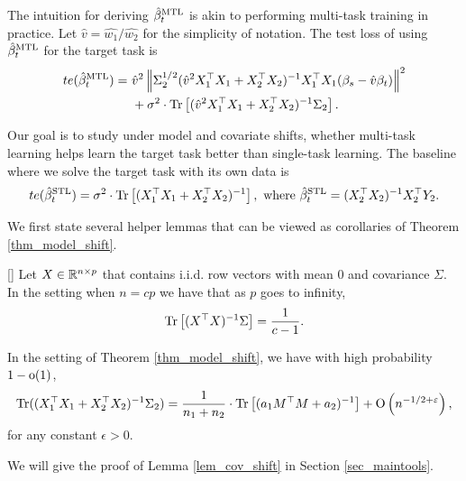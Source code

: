 The intuition for deriving $\hat{\beta}_t^{\text{MTL}}$ is akin to performing multi-task training in practice.
Let $\hat{v} = \hat{w_1} / \hat{w_2}$ for the simplicity of notation.
The test loss of using $\hat{\beta}_t^{\text{MTL}}$ for the target task is
\begin{align}
	te(\hat{\beta}_t^{\text{MTL}}) =&~ \hat{v}^2 \left\| \Sigma_2^{1/2}(\hat{v}^2 X_1^{\top}X_1 + X_2^{\top}X_2)^{-1} X_1^{\top}X_1 (\beta_s - \hat{v} \beta_t) \right\|^2 \nonumber \\
			&~ + \sigma^2 \cdot \operatorname{Tr}\left[(\hat{v}^2 X_1^{\top}X_1 + X_2^{\top}X_2)^{-1} \Sigma_2\right]. \label{eq_te_mtl_2task}
\end{align}

Our goal is to study under model and covariate shifts, whether multi-task learning helps learn the target task better than single-task learning.
The baseline where we solve the target task with its own data is
\begin{align*}
	te(\hat{\beta}_t^{\text{STL}}) = \sigma^2 \cdot \operatorname{Tr}\left[(X_1^{\top}X_1 + X_2^{\top}X_2)^{-1}\right], \text{ where } \hat{\beta}_t^{\text{STL}} = (X_2^{\top}X_2)^{-1} X_2^{\top}Y_2.
\end{align*}

We first state several helper lemmas that can be viewed as corollaries of Theorem \ref{thm_model_shift}.
\begin{lemma}\label{lem_minv}[]
	Let $X\in\mathbb{R}^{n\times p}$ that contains i.i.d. row vectors with mean $0$ and covariance $\Sigma$.
	In the setting when $n = c p$ we have that as $p$ goes to infinity,
	\[ \operatorname{Tr}\left[(X^{\top}X)^{-1}\Sigma\right] = \frac{1}{c - 1}. \]
\end{lemma}

\begin{lemma}\label{lem_cov_shift}
	 In the setting of Theorem \ref{thm_model_shift}, we have with high probability $1-{\rm o}(1)$,
\begin{align}\label{lem_cov_shift_eq}
\operatorname{Tr} ((X_1^{\top}X_1 + X_2^{\top}X_2)^{-1}\Sigma_2) = \frac{1}{n_1+n_2}\cdot \operatorname{Tr}\left[ (a_1 M^\top M + a_2)^{-1}\right] +\operatorname{O}\left( n^{-1/2+\varepsilon}\right),
\end{align}
	for any constant $\epsilon>0$.
\end{lemma}
We will give the proof of Lemma \ref{lem_cov_shift} in Section \ref{sec_maintools}.


